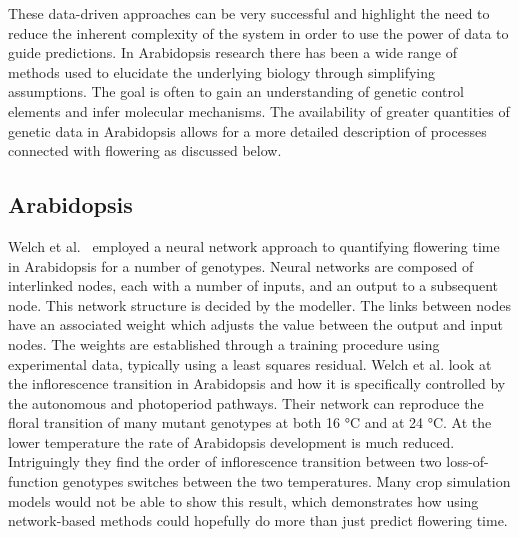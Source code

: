 These data-driven approaches can be very successful and highlight the need to reduce the inherent complexity of the system in order to use the power of data to guide predictions.
In Arabidopsis research there has been a wide range of methods used to elucidate the underlying biology through simplifying assumptions.
The goal is often to gain an understanding of genetic control elements and infer molecular mechanisms.
The availability of greater quantities of genetic data in Arabidopsis allows for a more detailed description of processes connected with flowering as discussed below.

\subsection{Arabidopsis}
\label{sec:modelsLit}
Welch et al.~\cite{welch2003} employed a neural network approach to quantifying flowering time in Arabidopsis for a number of genotypes.
Neural networks are composed of interlinked nodes, each with a number of inputs, and an output to a subsequent node.
This network structure is decided by the modeller.
The links between nodes have an associated weight which adjusts the value between the output and input nodes.
The weights are established through a training procedure using experimental data, typically using a least squares residual.
Welch et al. look at the inflorescence transition in Arabidopsis and how it is specifically controlled by the autonomous and photoperiod pathways.
Their network can reproduce the floral transition of many mutant genotypes at both 16 °C and at 24 °C.
At the lower temperature the rate of Arabidopsis development is much reduced.
Intriguingly they find the order of inflorescence transition between two loss-of-function genotypes switches between the two temperatures.
Many crop simulation models would not be able to show this result, which demonstrates how using network-based methods could hopefully do more than just predict flowering time.

